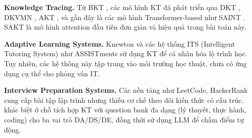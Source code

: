\textbf{Knowledge Tracing.} Từ BKT \cite{corbett1994knowledge}, các mô hình KT đã phát triển qua DKT \cite{piech2015deep}, DKVMN \cite{zhang2017dynamic}, AKT \cite{ghosh2020context}, và gần đây là các mô hình Transformer-based như SAINT \cite{choi2020towards}. SAKT \cite{pandey2019self} là mô hình attention đầu tiên đơn giản và hiệu quả trong bài toán này.

\textbf{Adaptive Learning Systems.} Knewton \cite{ferreira2017knewton} và các hệ thống ITS (Intelligent Tutoring System) như ASSISTments \cite{heffernan2014assistments} sử dụng KT để cá nhân hóa lộ trình học. Tuy nhiên, các hệ thống này tập trung vào môi trường học thuật, chưa có ứng dụng cụ thể cho phỏng vấn IT.

\textbf{Interview Preparation Systems.} Các nền tảng như LeetCode, HackerRank cung cấp bài tập lập trình nhưng thiếu cơ chế theo dõi kiến thức có cấu trúc. \system{} khác biệt ở chỗ tích hợp KT với question bank đa dạng (lý thuyết, thực hành, coding) cho ba vai trò DA/DS/DE, đồng thời sử dụng LLM để chấm điểm tự động.
